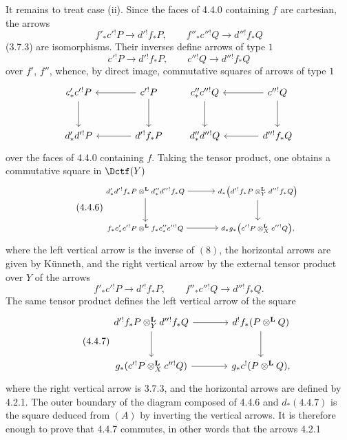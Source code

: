 \begin{prooftext}[Proof]
It remains to treat case (ii). Since the faces of 4.4.0 containing $f$ are cartesian, the arrows
\[
f'_*c'{}^!P\longrightarrow d'{}^!f_*P,\qquad
f''_*c''{}^!Q\longrightarrow d''{}^!f_*Q
\]
(3.7.3) are isomorphisms. Their inverses define arrows of type $1$
\[
c'{}^!P\longrightarrow d'{}^!f_*P,\qquad
c''{}^!Q\longrightarrow d''{}^!f_*Q
\]
over $f'$, $f''$, whence, by direct image, commutative squares of arrows of type $1$
\[
\begin{tikzcd}[column sep=large,row sep=large]
c'_*c'{}^!P \arrow[d] & c'{}^!P\arrow[l]\arrow[d]\\
d'_*d'{}^!P & d'{}^!f_*P\arrow[l]
\end{tikzcd}
\qquad
\begin{tikzcd}[column sep=large,row sep=large]
c''_*c''{}^!Q \arrow[d] & c''{}^!Q\arrow[l]\arrow[d]\\
d''_*d''{}^!Q & d''{}^!f_*Q\arrow[l]
\end{tikzcd}
\]
over the faces of 4.4.0 containing %
$f$. Taking the tensor product, one obtains a commutative square in $\Dctf(Y)$
\begin{equation}
\tag{4.4.6}
{\scriptsize
\begin{tikzcd}[column sep=large,row sep=large]
d'_*d'{}^!f_*P\otimes^{\mathbf L}d''_*d''{}^!f_*Q
 \arrow[r]\arrow[d] &
d_*\bigl(d'{}^!f_*P\otimes_Y^{\mathbf L}d''{}^!f_*Q\bigr)\arrow[d]\\
f_*c'_*c'{}^!P\otimes^{\mathbf L}f_*c''_*c''{}^!Q
 \arrow[r] &
d_*g_*\bigl(c'{}^!P\otimes_X^{\mathbf L}c''{}^!Q\bigr),
\end{tikzcd}
}
\end{equation}
where the left vertical arrow is the inverse of $(8)$, the horizontal arrows are given by Künneth, and the right vertical arrow by the external tensor product over $Y$ of the arrows
\[
f'_*c'{}^!P\longrightarrow d'{}^!f_*P,\qquad
f''_*c''{}^!Q\longrightarrow d''{}^!f_*Q.
\]
The same tensor product defines the left vertical arrow of the square
\begin{equation}
\tag{4.4.7}
\begin{tikzcd}[column sep=large,row sep=large]
d'{}^!f_*P\otimes_Y^{\mathbf L}d''{}^!f_*Q
 \arrow[r]\arrow[d] &
d^!f_*(P\otimes^{\mathbf L}Q)\arrow[d]\\
g_*(c'{}^!P\otimes_X^{\mathbf L}c''{}^!Q)
 \arrow[r] &
g_*c^!(P\otimes^{\mathbf L}Q),
\end{tikzcd}
\end{equation}
where the right vertical arrow is 3.7.3, and the horizontal arrows are defined by 4.2.1. The outer boundary of the diagram composed of 4.4.6 and $d_*(4.4.7)$ is the square deduced from $(A)$ by inverting the vertical arrows. It is therefore enough to prove that 4.4.7 commutes, in other words that the arrows 4.2.1

\end{prooftext}
